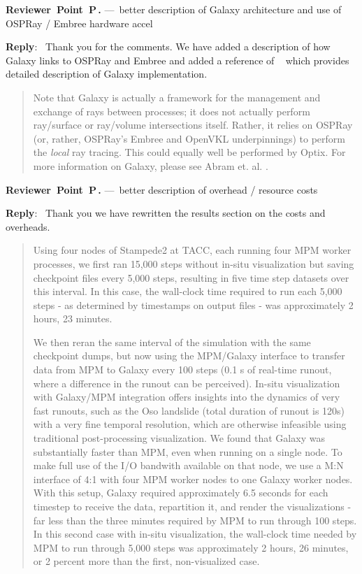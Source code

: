 \documentclass[11pt]{article}
\newcounter{reviewer}
\newcounter{point}[reviewer]
\renewcommand{\thepoint}{P\,\thereviewer.\arabic{point}}
\newcommand{\shortpoint}[1]{\refstepcounter{point}  \bigskip \noindent 
	{\textbf{Reviewer~Point~\thepoint} } ---~#1\par }
\newenvironment{reply}
   {\medskip \noindent \begin{sf}\textbf{Reply}:\  }
   {\medskip \end{sf}}
\begin{document}
\shortpoint{better description of Galaxy architecture and use of OSPRay / Embree hardware accel}

\begin{reply}
Thank you for the comments. We have added a description of how Galaxy links to OSPRay and Embree and added a reference of ~\cite{abram2018galaxy} which provides detailed description of Galaxy implementation. 
\begin{quote}
    Note that Galaxy is actually a framework for the management and exchange of rays between processes; it does not actually perform ray/surface or ray/volume     intersections itself.  Rather, it relies on OSPRay (or, rather, OSPRay's Embree and OpenVKL underpinnings) to perform the \textit{local} ray tracing.  This could equally well be performed by Optix.  For more information on Galaxy, please see Abram et. al. \cite{abram2018galaxy}.    
\end{quote}
\end{reply}

\shortpoint{better description of overhead / resource costs }
\begin{reply}
Thank you we have rewritten the results section on the costs and overheads. 

\begin{quote}
    Using four nodes of Stampede2 at TACC, each running four MPM worker processes, we first ran 15,000 steps without in-situ visualization but saving checkpoint files every 5,000 steps, resulting in five time step datasets over this interval. In this case, the wall-clock time required to run each 5,000 steps - as determined by timestamps on output files - was approximately 2 hours, 23 minutes.
    
    We then reran the same interval of the simulation with the same checkpoint dumps, but now using the MPM/Galaxy interface to transfer data from MPM to Galaxy every 100 steps (0.1 s of real-time runout, where a difference in the runout can be perceived).  In-situ visualization with Galaxy/MPM integration offers insights into the dynamics of very fast runouts, such as the Oso landslide (total duration of runout is 120s) with a very fine temporal resolution, which are otherwise infeasible using traditional post-processing visualization. We found that Galaxy was substantially faster than MPM, even when running on a single node.  To make full use of the I/O bandwith available on that node, we use a M:N interface of 4:1 with four MPM worker nodes to one Galaxy worker nodes.  With this setup, Galaxy required approximately 6.5 seconds for each timestep to receive the data, repartition it, and render the visualizations - far less than the three minutes required by MPM to run through 100 steps.   In this second case with in-situ visualization, the wall-clock time needed by MPM to run through 5,000 steps was approximately 2 hours, 26 minutes, or 2 percent more than the first, non-visualized case. 
\end{quote}

\end{reply}
\end{document}
